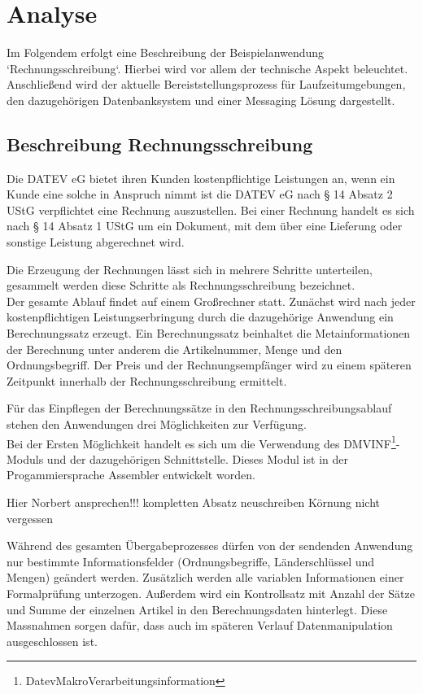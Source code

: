\chapter{Analyse}\label{ch:analyse}
Im Folgendem erfolgt eine Beschreibung der Beispielanwendung `Rechnungsschreibung`.
Hierbei wird vor allem der technische Aspekt beleuchtet.
Anschließend wird der aktuelle Bereiststellungsprozess für Laufzeitumgebungen, den dazugehörigen Datenbanksystem und einer Messaging Lösung dargestellt.

\section{Beschreibung Rechnungsschreibung}
Die DATEV eG bietet ihren Kunden kostenpflichtige Leistungen an, wenn ein Kunde eine solche in Anspruch nimmt ist die DATEV eG nach § 14 Absatz 2 UStG verpflichtet eine Rechnung auszustellen.
Bei einer Rechnung handelt es sich nach § 14 Absatz 1 UStG um ein Dokument, mit dem über eine Lieferung oder sonstige Leistung abgerechnet wird.

Die Erzeugung der Rechnungen lässt sich in mehrere Schritte unterteilen, gesammelt werden diese Schritte als Rechnungsschreibung bezeichnet.\\
Der gesamte Ablauf findet auf einem Großrechner statt.
Zunächst wird nach jeder kostenpflichtigen Leistungserbringung durch die dazugehörige Anwendung ein Berechnungssatz erzeugt.
Ein Berechnungssatz beinhaltet die Metainformationen der Berechnung unter anderem die Artikelnummer, Menge und den Ordnungsbegriff.
Der Preis und der Rechnungsempfänger wird zu einem späteren Zeitpunkt innerhalb der Rechnungsschreibung ermittelt.

Für das Einpflegen der Berechnungssätze in den Rechnungsschreibungsablauf stehen den Anwendungen drei Möglichkeiten zur Verfügung. \\
Bei der Ersten Möglichkeit handelt es sich um die Verwendung des DMVINF\footnote{DatevMakroVerarbeitungsinformation}-Moduls und der dazugehörigen Schnittstelle.
Dieses Modul ist in der Progammiersprache Assembler entwickelt worden.

Hier Norbert ansprechen!!! kompletten Absatz neuschreiben Körnung nicht vergessen

Während des gesamten Übergabeprozesses dürfen von der sendenden Anwendung nur bestimmte Informationsfelder (Ordnungsbegriffe, Länderschlüssel und Mengen) geändert werden.
Zusätzlich werden alle variablen Informationen einer Formalprüfung unterzogen.
Außerdem wird ein Kontrollsatz mit Anzahl der Sätze und Summe der einzelnen Artikel in den Berechnungsdaten hinterlegt.
Diese Massnahmen sorgen dafür, dass auch im späteren Verlauf Datenmanipulation ausgeschlossen ist. \\


